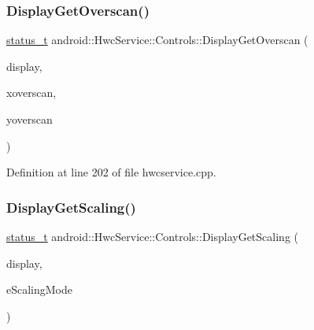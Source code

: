 \subsubsection{\texorpdfstring{Display\+Get\+Overscan()}{DisplayGetOverscan()}}
{\footnotesize\ttfamily \mbox{\hyperlink{hwcserviceapi_8h_a3806fb2027d9a316d8ca8d9b8b8eb96f}{status\+\_\+t}} android\+::\+Hwc\+Service\+::\+Controls\+::\+Display\+Get\+Overscan (\begin{DoxyParamCaption}\item[{uint32\+\_\+t}]{display,  }\item[{int32\+\_\+t $\ast$}]{xoverscan,  }\item[{int32\+\_\+t $\ast$}]{yoverscan }\end{DoxyParamCaption})}



Definition at line 202 of file hwcservice.\+cpp.


\begin{DoxyCode}{0}
\end{DoxyCode}
\mbox{\label{classandroid_1_1HwcService_1_1Controls_a374b5ef0ffbe6cfc6cce6981b0647431}} 
\subsubsection{\texorpdfstring{Display\+Get\+Scaling()}{DisplayGetScaling()}}
{\footnotesize\ttfamily \mbox{\hyperlink{hwcserviceapi_8h_a3806fb2027d9a316d8ca8d9b8b8eb96f}{status\+\_\+t}} android\+::\+Hwc\+Service\+::\+Controls\+::\+Display\+Get\+Scaling (\begin{DoxyParamCaption}\item[{uint32\+\_\+t}]{display,  }\item[{\mbox{\hyperlink{hwcserviceapi_8h_acdadfd5e7f15097833789174e442083f}{E\+Hwcs\+Scaling\+Mode}} $\ast$}]{e\+Scaling\+Mode }\end{DoxyParamCaption})}



